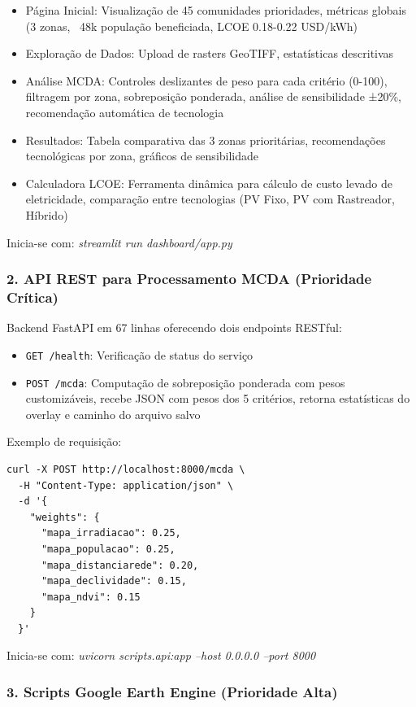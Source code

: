 \documentclass[12pt, a4paper]{article}
\begin{document}
\begin{itemize}
    \item Página Inicial: Visualização de 45 comunidades prioridades, métricas globais (3 zonas, ~48k população beneficiada, LCOE 0.18-0.22 USD/kWh)
    \item Exploração de Dados: Upload de rasters GeoTIFF, estatísticas descritivas
    \item Análise MCDA: Controles deslizantes de peso para cada critério (0-100), filtragem por zona, sobreposição ponderada, análise de sensibilidade ±20\%, recomendação automática de tecnologia
    \item Resultados: Tabela comparativa das 3 zonas prioritárias, recomendações tecnológicas por zona, gráficos de sensibilidade
    \item Calculadora LCOE: Ferramenta dinâmica para cálculo de custo levado de eletricidade, comparação entre tecnologias (PV Fixo, PV com Rastreador, Híbrido)
\end{itemize}

Inicia-se com: \textit{streamlit run dashboard/app.py}

\subsubsection{2. API REST para Processamento MCDA (Prioridade Crítica)}

Backend FastAPI em 67 linhas oferecendo dois endpoints RESTful:

\begin{itemize}
    \item \texttt{GET /health}: Verificação de status do serviço
    \item \texttt{POST /mcda}: Computação de sobreposição ponderada com pesos customizáveis, recebe JSON com pesos dos 5 critérios, retorna estatísticas do overlay e caminho do arquivo salvo
\end{itemize}

Exemplo de requisição:
\begin{verbatim}
curl -X POST http://localhost:8000/mcda \
  -H "Content-Type: application/json" \
  -d '{
    "weights": {
      "mapa_irradiacao": 0.25,
      "mapa_populacao": 0.25,
      "mapa_distanciarede": 0.20,
      "mapa_declividade": 0.15,
      "mapa_ndvi": 0.15
    }
  }'
\end{verbatim}

Inicia-se com: \textit{uvicorn scripts.api:app --host 0.0.0.0 --port 8000}

\subsubsection{3. Scripts Google Earth Engine (Prioridade Alta)}
\end{document}
